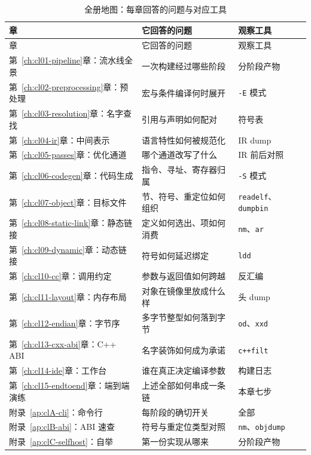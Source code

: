 \documentclass[12pt,a4paper,fontset=fandol]{ctexbook}
\newcommand{\cpp}[1]{C++#1}
\newcommand{\Tool}[1]{\texttt{#1}}
\newcommand{\Sw}[1]{\texttt{#1}}
\newcommand{\Mx}[1]{\textsf{#1}}
\begin{document}
\begin{longtable}{@{}>{\raggedright\arraybackslash}p{} >{\raggedright\arraybackslash}p{} >{\raggedright\arraybackslash}p{}@{}}
\caption{全册地图：每章回答的问题与对应工具}\label{tab:cl15-map}\\
\toprule
章 & 它回答的问题 & 观察工具 \\
\midrule
\endfirsthead
\toprule
章 & 它回答的问题 & 观察工具 \\
\midrule
\endhead
第~\ref{ch:cl01-pipeline}章：流水线全景 & 一次构建经过哪些阶段 & 分阶段产物 \\
第~\ref{ch:cl02-preprocessing}章：预处理 & 宏与条件编译何时展开 & \Sw{-E} 模式 \\
第~\ref{ch:cl03-resolution}章：名字查找 & 引用与声明如何配对 & 符号表 \\
第~\ref{ch:cl04-ir}章：中间表示 & 语言特性如何被规范化 & \Mx{IR} dump \\
第~\ref{ch:cl05-passes}章：优化通道 & 哪个通道改写了什么 & \Mx{IR} 前后对照 \\
第~\ref{ch:cl06-codegen}章：代码生成 & 指令、寻址、寄存器归属 & \Sw{-S} 模式 \\
第~\ref{ch:cl07-object}章：目标文件 & 节、符号、重定位如何组织 & \Tool{readelf}、\Tool{dumpbin} \\
第~\ref{ch:cl08-static-link}章：静态链接 & 定义如何选出、项如何消费 & \Tool{nm}、\Tool{ar} \\
第~\ref{ch:cl09-dynamic}章：动态链接 & 符号如何延迟绑定 & \Tool{ldd} \\
第~\ref{ch:cl10-cc}章：调用约定 & 参数与返回值如何跨越 & 反汇编 \\
第~\ref{ch:cl11-layout}章：内存布局 & 对象在镜像里放成什么样 & 头 dump \\
第~\ref{ch:cl12-endian}章：字节序 & 多字节整型如何落到字节 & \Tool{od}、\Tool{xxd} \\
第~\ref{ch:cl13-cxx-abi}章：\cpp{} \Mx{ABI} & 名字装饰如何成为承诺 & \Tool{c++filt} \\
第~\ref{ch:cl14-ide}章：工作台 & 谁在真正决定编译参数 & 构建日志 \\
第~\ref{ch:cl15-endtoend}章：端到端演练 & 上述全部如何串成一条链 & 本章七步 \\
附录~\ref{ap:clA-cli}：命令行 & 每阶段的确切开关 & 全部 \\
附录~\ref{ap:clB-abi}：\Mx{ABI} 速查 & 符号与重定位类型对照 & \Tool{nm}、\Tool{objdump} \\
附录~\ref{ap:clC-selfhost}：自举 & 第一份实现从哪来 & 分阶段产物 \\
\bottomrule
\end{longtable}
\end{document}
